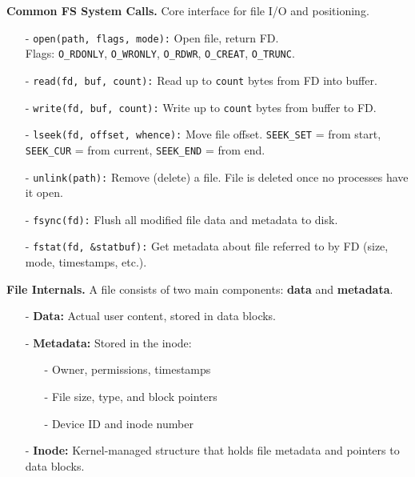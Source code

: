 \documentclass[8pt]{extarticle}
\begin{document}
\begin{minipage}[htp]{0.5\textwidth}
    \vspace{15px}
    \noindent\textbf{Common FS System Calls.} Core interface for file I/O and positioning.
    \begin{itemize}[noitemsep,nolistsep,topsep=-10px,partopsep=0pt,parsep=0pt]
        \item[-] \texttt{open(path, flags, mode):} Open file, return FD. \\Flags: \texttt{O\_RDONLY}, \texttt{O\_WRONLY}, \texttt{O\_RDWR}, \texttt{O\_CREAT}, \texttt{O\_TRUNC}.
        \item[-] \texttt{read(fd, buf, count):} Read up to \texttt{count} bytes from FD into buffer.
        \item[-] \texttt{write(fd, buf, count):} Write up to \texttt{count} bytes from buffer to FD.
        \item[-] \texttt{lseek(fd, offset, whence):} Move file offset. \texttt{SEEK\_SET} = from start, \texttt{SEEK\_CUR} = from current, \texttt{SEEK\_END} = from end.
        \item[-] \texttt{unlink(path):} Remove (delete) a file. File is deleted once no processes have it open.
        \item[-] \texttt{fsync(fd):} Flush all modified file data and metadata to disk.
        \item[-] \texttt{fstat(fd, \&statbuf):} Get metadata about file referred to by FD (size, mode, timestamps, etc.).
    \end{itemize}    
    \vspace{15px}
    \begin{minipage}[t]{0.49\textwidth}
        \noindent\textbf{File Internals.} A file consists of two main components: \textbf{data} and \textbf{metadata}.
        \begin{itemize}[noitemsep,nolistsep,topsep=-8px,partopsep=0pt,parsep=0pt]
            \item[-] \textbf{Data:} Actual user content, stored in data blocks.
            \item[-] \textbf{Metadata:} Stored in the inode:
            \begin{itemize}[noitemsep,nolistsep]
                \item[-] Owner, permissions, timestamps
                \item[-] File size, type, and block pointers
                \item[-] Device ID and inode number
            \end{itemize}
            \item[-] \textbf{Inode:} Kernel-managed structure that holds file metadata and pointers to data blocks.

\end{itemize}
\end{minipage}
\end{minipage}
\end{document}
